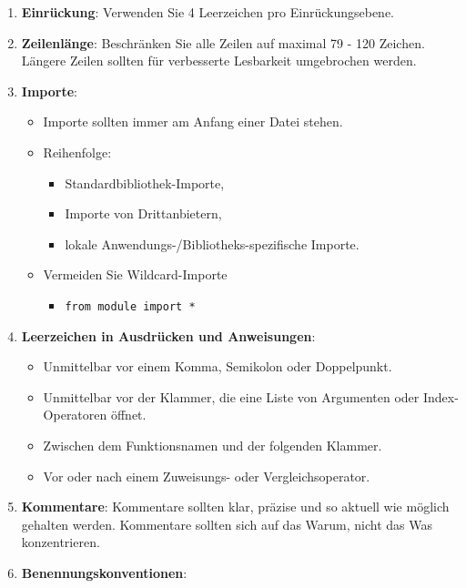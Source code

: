 \documentclass{vorlage-design-main}
\begin{document}
\begin{enumerate}
\def\labelenumi{\arabic{enumi}.}
\item
  \textbf{Einrückung}: Verwenden Sie 4 Leerzeichen pro Einrückungsebene.
\item
  \textbf{Zeilenlänge}: Beschränken Sie alle Zeilen auf maximal 79 - 120
  Zeichen. Längere Zeilen sollten für verbesserte Lesbarkeit umgebrochen
  werden.
\item
  \textbf{Importe}:

  \begin{itemize}
  
  \item
    Importe sollten immer am Anfang einer Datei stehen.
  \item
    Reihenfolge:

    \begin{itemize}
    
    \item
      Standardbibliothek-Importe,
    \item
      Importe von Drittanbietern,
    \item
      lokale Anwendungs-/Bibliotheks-spezifische Importe.
    \end{itemize}
  \item
    Vermeiden Sie Wildcard-Importe

    \begin{itemize}
    
    \item
      \verb|from module import *|
    \end{itemize}
  \end{itemize}
\item
  \textbf{Leerzeichen in Ausdrücken und Anweisungen}:

  \begin{itemize}
  
  \item
    Unmittelbar vor einem Komma, Semikolon oder Doppelpunkt.
  \item
    Unmittelbar vor der Klammer, die eine Liste von Argumenten oder
    Index-Operatoren öffnet.
  \item
    Zwischen dem Funktionsnamen und der folgenden Klammer.
  \item
    Vor oder nach einem Zuweisungs- oder Vergleichsoperator.
  \end{itemize}
\item
  \textbf{Kommentare}: Kommentare sollten klar, präzise und so aktuell
  wie möglich gehalten werden. Kommentare sollten sich auf das Warum,
  nicht das Was konzentrieren.
\item
  \textbf{Benennungskonventionen}:


\end{enumerate}
\end{document}
